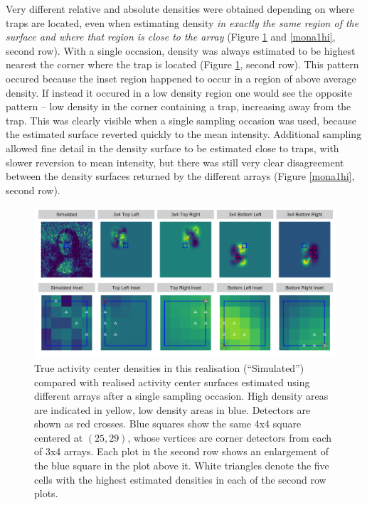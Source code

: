 \documentclass[10pt,a4paper]{article}
\begin{document}
Very different relative and absolute densities were obtained depending on where traps are located, even when estimating density {\it in exactly the same region of the surface and where that region is close to the array} (Figure \ref{mona1low} and \ref{mona1hi}, second row). With a single occasion, density was always estimated to be highest nearest the corner where the trap is located (Figure \ref{mona1low}, second row). This pattern occured because the inset region happened to occur in a region of above average density. If instead it occured in a low density region one would see the opposite pattern -- low density in the corner containing a trap, increasing away from the trap. This was clearly visible when a single sampling occasion was used, because the estimated surface reverted quickly to the mean intensity. Additional sampling allowed fine detail in the density surface to be estimated close to traps, with slower reversion to mean intensity, but there was still very clear disagreement between the density surfaces returned by the different arrays (Figure \ref{mona1hi}, second row).

\begin{figure}[htbp]
\centering
\includegraphics[width=1\textwidth]{many_faces_mona_loweffort.png}
\caption{True activity center densities in this realisation (``Simulated'') compared with realised activity center surfaces estimated using different arrays after a single sampling occasion. High density areas are indicated in yellow, low density areas in blue. Detectors are shown as red crosses. Blue squares show the same 4x4 square centered at $(25,29)$, whose vertices are corner detectors from each of 3x4 arrays. Each plot in the second row shows an enlargement of the blue square in the plot above it. White triangles denote the five cells with the highest estimated densities in each of the second row plots.}
\label{mona1low}
\end{figure}
\end{document}
